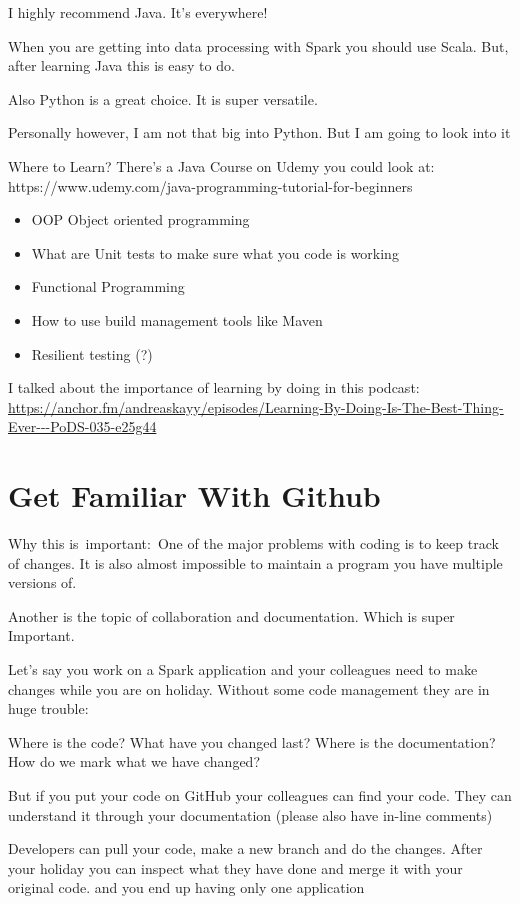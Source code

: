 \documentclass[12pt, numbers=noenddot]{scrreprt} %
\begin{document}
I highly recommend Java. It’s everywhere!

When you are getting into data processing with Spark you should use Scala. But, after learning Java this is easy to do.

Also Python is a great choice. It is super versatile.

Personally however, I am not that big into Python. But I am going to look into it

Where to Learn?
There’s a Java Course on Udemy you could look at: https://www.udemy.com/java-programming-tutorial-for-beginners

\begin{itemize}
\item OOP Object oriented programming
\item What are Unit tests to make sure what you code is working
\item Functional Programming
\item How to use build management tools like Maven
\item Resilient testing (?)
\end{itemize}
I talked about the importance of learning by doing in this podcast: 
\url{https://anchor.fm/andreaskayy/episodes/Learning-By-Doing-Is-The-Best-Thing-Ever---PoDS-035-e25g44}

\chapter{Get Familiar With Github}
Why this is important: One of the major problems with coding is to keep track of changes. It is also almost impossible to maintain a program you have multiple versions of.

Another is the topic of collaboration and documentation. Which is super Important.

Let’s say you work on a Spark application and your colleagues need to make changes while you are on holiday. Without some code management they are in huge trouble:

Where is the code? What have you changed last? Where is the documentation? How do we mark what we have changed?

But if you put your code on GitHub your colleagues can find your code. They can understand it through your documentation (please also have in-line comments)

Developers can pull your code, make a new branch and do the changes. After your holiday you can inspect what they have done and merge it with your original code. and you end up having only one application
\end{document}
